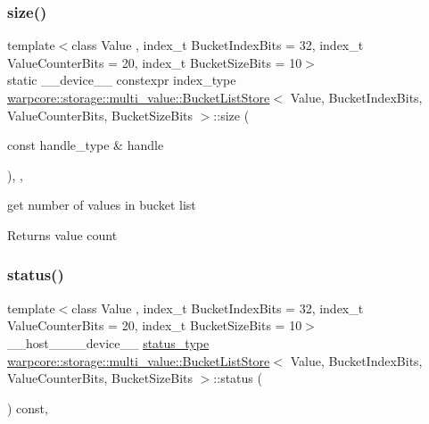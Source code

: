 \subsubsection{\texorpdfstring{size()}{size()}}
{\footnotesize\ttfamily template$<$class Value , index\+\_\+t Bucket\+Index\+Bits = 32, index\+\_\+t Value\+Counter\+Bits = 20, index\+\_\+t Bucket\+Size\+Bits = 10$>$ \\
static \+\_\+\+\_\+device\+\_\+\+\_\+ constexpr index\+\_\+type \hyperlink{classwarpcore_1_1storage_1_1multi__value_1_1BucketListStore}{warpcore\+::storage\+::multi\+\_\+value\+::\+Bucket\+List\+Store}$<$ Value, Bucket\+Index\+Bits, Value\+Counter\+Bits, Bucket\+Size\+Bits $>$\+::size (\begin{DoxyParamCaption}\item[{const handle\+\_\+type \&}]{handle }\end{DoxyParamCaption})\hspace{0.3cm}{\ttfamily [inline]}, {\ttfamily [static]}, {\ttfamily [noexcept]}}



get number of values in bucket list 

\begin{DoxyReturn}{Returns}
value count 
\end{DoxyReturn}
\mbox{\label{classwarpcore_1_1storage_1_1multi__value_1_1BucketListStore_a89173b5956d3bf4c8f2ed4bb9a7d50a7}} 
\subsubsection{\texorpdfstring{status()}{status()}}
{\footnotesize\ttfamily template$<$class Value , index\+\_\+t Bucket\+Index\+Bits = 32, index\+\_\+t Value\+Counter\+Bits = 20, index\+\_\+t Bucket\+Size\+Bits = 10$>$ \\
\+\_\+\+\_\+host\+\_\+\+\_\+\+\_\+\+\_\+device\+\_\+\+\_\+ \hyperlink{classwarpcore_1_1Status}{status\+\_\+type} \hyperlink{classwarpcore_1_1storage_1_1multi__value_1_1BucketListStore}{warpcore\+::storage\+::multi\+\_\+value\+::\+Bucket\+List\+Store}$<$ Value, Bucket\+Index\+Bits, Value\+Counter\+Bits, Bucket\+Size\+Bits $>$\+::status (\begin{DoxyParamCaption}{ }\end{DoxyParamCaption}) const\hspace{0.3cm}{\ttfamily [inline]}, {\ttfamily [noexcept]}}



